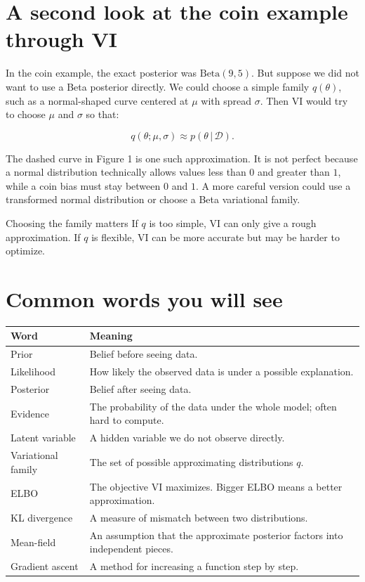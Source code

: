 \documentclass[11pt]{article}
\newcommand{\data}{\mathcal{D}}
\newcommand{\given}{\,|\,}
\begin{document}
\section{A second look at the coin example through VI}

In the coin example, the exact posterior was $\mathrm{Beta}(9,5)$.
But suppose we did not want to use a Beta posterior directly.
We could choose a simple family $q(\theta)$, such as a normal-shaped curve centered at $\mu$ with spread $\sigma$.
Then VI would try to choose $\mu$ and $\sigma$ so that:

\[
q(\theta;\mu,\sigma) \approx p(\theta\given \data).
\]

The dashed curve in Figure 1 is one such approximation.
It is not perfect because a normal distribution technically allows values less than $0$ and greater than $1$, while a coin bias must stay between $0$ and $1$.
A more careful version could use a transformed normal distribution or choose a Beta variational family.

\begin{idea}{Choosing the family matters}
If $q$ is too simple, VI can only give a rough approximation. If $q$ is flexible, VI can be more accurate but may be harder to optimize.
\end{idea}

\section{Common words you will see}

\begin{center}
\renewcommand{\arraystretch}{1.25}
\begin{tabular}{>{\raggedright\arraybackslash}p{} >{\raggedright\arraybackslash}p{}}
\toprule
Word & Meaning \\
\midrule
Prior & Belief before seeing data. \\
Likelihood & How likely the observed data is under a possible explanation. \\
Posterior & Belief after seeing data. \\
Evidence & The probability of the data under the whole model; often hard to compute. \\
Latent variable & A hidden variable we do not observe directly. \\
Variational family & The set of possible approximating distributions $q$. \\
ELBO & The objective VI maximizes. Bigger ELBO means a better approximation. \\
KL divergence & A measure of mismatch between two distributions. \\
Mean-field & An assumption that the approximate posterior factors into independent pieces. \\
Gradient ascent & A method for increasing a function step by step. \\
\bottomrule
\end{tabular}
\end{center}
\end{document}
